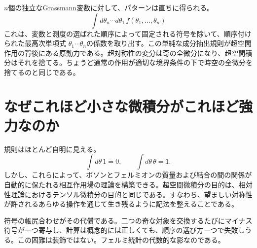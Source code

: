 \begin{classroomqa}
\end{classroomqa}

\begin{classroomqa}
\end{classroomqa}

\(n\)個の独立なGrassmann変数に対して、パターンは直ちに得られる。
\begin{equation}
\int d\theta_n\cdots d\theta_1\,
f(\theta_1,\ldots,\theta_n)
\end{equation}
これは、変数と測度の選ばれた順序によって固定される符号を除いて、順序付けられた最高次単項式
\(\theta_1\cdots\theta_n\)の係数を取り出す。この単純な成分抽出規則が超空間作用の背後にある原動力である。超対称性の変分は奇の全微分になり、超空間積分はそれを捨てる。ちょうど通常の作用が適切な境界条件の下で時空の全微分を捨てるのと同じである。

\section{なぜこれほど小さな微積分がこれほど強力なのか}

規則はほとんど自明に見える。
\begin{equation}
\int d\theta\,1=0,
\qquad
\int d\theta\,\theta=1.
\end{equation}
しかし、これらによって、ボソンとフェルミオンの質量および結合の間の関係が自動的に保たれる相互作用場の理論を構築できる。超空間微積分の目的は、相対性理論におけるテンソル微積分の目的と同じである。すなわち、望ましい対称性が許されるあらゆる操作を通じて生き残るように記法を整えることである。

符号の帳尻合わせがその代償である。二つの奇な対象を交換するたびにマイナス符号が一つ寄与し、計算は概念的には正しくても、順序の選び方一つで失敗しうる。この困難は装飾ではない。フェルミ統計の代数的な影なのである。

